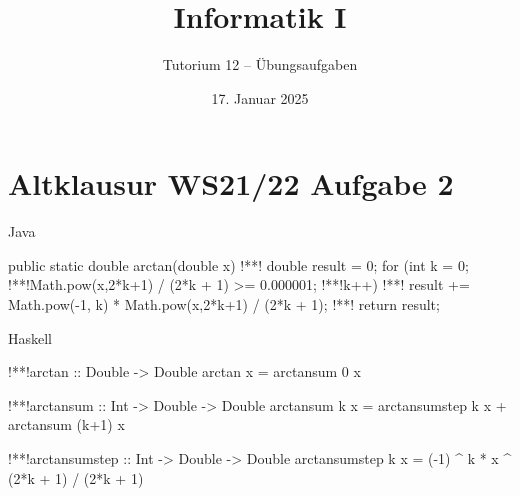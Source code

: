 \documentclass[aspectratio=169,usepdftitle=true,11pt,ngerman,t]{beamer}
\subtitle{Tutorium 12 -- Übungsaufgaben}
\date{17. Januar 2025}
\title{Informatik I}
\author{\lqfullname}
\begin{document}

\section{Altklausur WS21/22 Aufgabe 2}

\begin{frame}[fragile]{Java}\onslide<+->
    \begin{plainjava}
public static double arctan(double x) {
!*\onslide<+->*!	double result = 0;
	for (int k = 0; !*\onslide<+->*!Math.pow(x,2*k+1) / (2*k + 1) >= 0.000001; !*\onslide<+->*!k++) {
!*\onslide<+->*!		result += Math.pow(-1, k) * Math.pow(x,2*k+1) / (2*k + 1);
	}
!*\onslide<+->*!	return result;
}
    \end{plainjava}
\end{frame}

\begin{frame}[fragile]{Haskell}\onslide<+->
    \begin{plainhaskell}
!*\onslide<+->*!arctan :: Double -> Double
arctan x = arctansum 0 x

!*\onslide<+->*!arctansum :: Int -> Double -> Double
arctansum k x = arctansumstep k x + arctansum (k+1) x

!*\onslide<+->*!arctansumstep :: Int -> Double -> Double
arctansumstep k x = (-1) ^ k * x ^ (2*k + 1) / (2*k + 1)
    \end{plainhaskell}
\end{frame}
\end{document}
